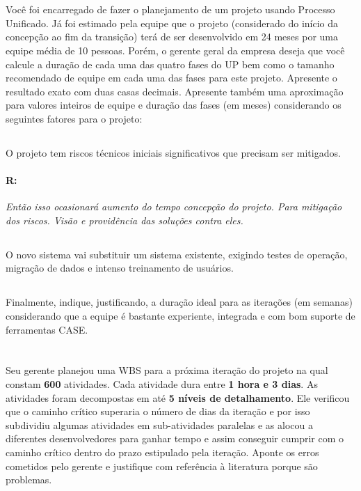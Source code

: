 \documentclass[10pt,a5paper]{report}
\begin{document}
\section{}
\qquad Você foi encarregado de fazer o planejamento de um projeto usando
Processo Unificado. Já foi estimado pela equipe que o projeto (considerado do
início da concepção ao fim da transição) terá de ser desenvolvido em 24 meses
por uma equipe média de 10 pessoas. Porém, o gerente geral da empresa deseja que
você calcule a duração de cada uma das quatro fases do UP bem como o tamanho
recomendado de equipe em cada uma das fases para este projeto. Apresente o
resultado exato com duas casas decimais. Apresente também uma aproximação para
valores inteiros de equipe e duração das fases (em meses) considerando os
seguintes fatores para o projeto:

\subsection{}
\qquad O projeto tem riscos técnicos iniciais significativos que precisam ser
mitigados.

\paragraph{R:}

\textit{Então isso ocasionará aumento do tempo concepção do projeto. Para mitigação dos riscos. Visão e providência das soluções contra eles.}



\subsection{}
\qquad O novo sistema vai substituir um sistema existente, exigindo testes de
operação, migração de dados e intenso treinamento de usuários.

\subsection{}
\qquad Finalmente, indique, justificando, a duração ideal para as iterações (em
semanas) considerando que a equipe é bastante experiente, integrada e com bom
suporte de ferramentas CASE.

\section{}

\qquad Seu gerente planejou uma WBS para a próxima iteração do projeto na qual
constam \textbf{600} atividades. Cada atividade dura entre \textbf{1 hora e 3
dias}. As atividades foram decompostas em até \textbf{5 níveis de detalhamento}.
Ele verificou que o caminho crítico superaria o número de dias da iteração e por
isso subdividiu algumas atividades em sub-atividades paralelas e as alocou a
diferentes desenvolvedores para ganhar tempo e assim conseguir cumprir com o
caminho crítico dentro do prazo estipulado pela iteração. Aponte os erros
cometidos pelo gerente e justifique com referência à literatura porque são
problemas.
\end{document}
